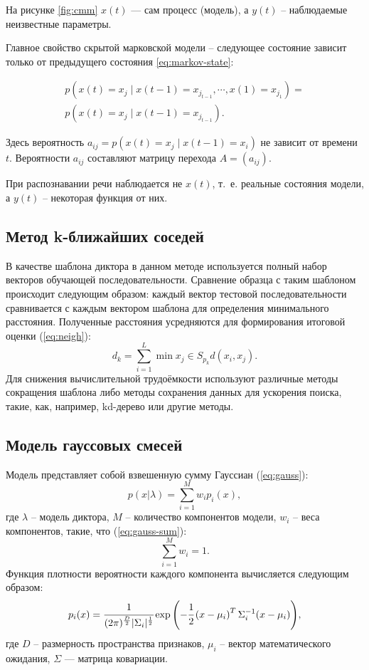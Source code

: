 На рисунке \ref{fig:cmm} $x(t)$ — сам процесс (модель), а $y(t)$ -- наблюдаемые неизвестные параметры.

Главное свойство скрытой марковской модели -- следующее состояние зависит только от предыдущего состояния \ref{eq:markov-state}:

\begin{equation}\label{eq:markov-state}
	\begin{gathered}
		p(x(t) = x_j \;| \; x(t - 1) = x_{j_{t - 1}}, \cdots, x(1) = x_{j_1}) = \\ 
		p(x(t) = x_{j}\;|\;x(t - 1) = x_{j_{t - 1}}). \;\;\;
	\end{gathered}
\end{equation}

Здесь вероятность $a_{ij} = p(x(t) = x_j \;| \; x(t - 1) = x_{i})$ не зависит от времени $t$.
Вероятности $a_{ij}$ составляют матрицу перехода $A = (a_{ij})$.


При распознавании речи наблюдается не $x(t)$, т.~е. реальные состояния модели, а $y(t)$ -- некоторая функция от них.

\subsection{Метод k-ближайших соседей }
В качестве шаблона диктора в данном методе используется полный набор векторов обучающей последовательности. Сравнение образца с таким шаблоном происходит следующим образом: каждый вектор тестовой последовательности сравнивается с каждым вектором шаблона для определения минимального расстояния. Полученные расстояния усредняются для формирования итоговой оценки (\ref{eq:neigh}):
\begin{equation}\label{eq:neigh}
    d_k = \sum^{L}_{i = 1}\min{x_j\in S_{p_k}}d(x_i, x_j).
\end{equation}
Для снижения вычислительной трудоёмкости используют различные методы сокращения шаблона либо методы сохранения данных для ускорения поиска, такие, как, например, kd-дерево или другие методы. \cite{det}
\subsection{Модель гауссовых смесей}
Модель представляет собой взвешенную сумму Гауссиан (\ref{eq:gauss}):
\begin{equation}\label{eq:gauss}
    p(x | \lambda) = \sum^{M}_{i = 1}w_ip_i(x),
\end{equation}
где $\lambda$ -- модель диктора, $M$ -- количество компонентов модели, $w_i$ -- веса компонентов, такие, что (\ref{eq:gauss-sum}):
\begin{equation}\label{eq:gauss-sum}
     \sum^{M}_{i = 1}w_i = 1.
\end{equation}
Функция плотности вероятности каждого компонента вычисляется следующим образом:
\begin{equation}\label{eq:gauss-prob}
     p_i(x) = \cfrac{1}{(2\pi)^{\frac{D}{2}} |\Sigma_i|^{\frac{1}{2}}}
     \exp{\left(-\cfrac{1}{2}\left(x - \mu_i\right)^T\Sigma_{i}^{-1}(x - \mu_i)\right)},
\end{equation}
где $D$ -- размерность пространства признаков, $\mu_i$ -- вектор математического ожидания, $\Sigma$ — матрица ковариации.
